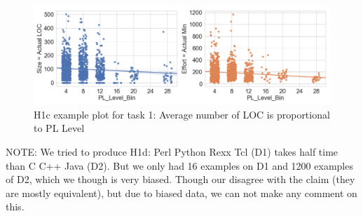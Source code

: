 \documentclass[sigconf,review]{acmart}
\begin{document}
\begin{figure}[!t]
\begin{center}
\includegraphics[width=\linewidth]{resources/h1c_example.png}
\caption{H1c example plot for task 1: Average number of LOC is proportional to PL Level}
\label{fig:h1c_example}
\end{center}
\end{figure}


NOTE: We tried to produce H1d: Perl Python Rexx Tcl (D1) takes half time than C C++ Java (D2). But we only had 16 examples on D1 and 1200 examples of D2, which we though is very biased. Though our disagree with the claim (they are mostly equivalent), but due to biased data, we can not make any comment on this. 





\end{document}
